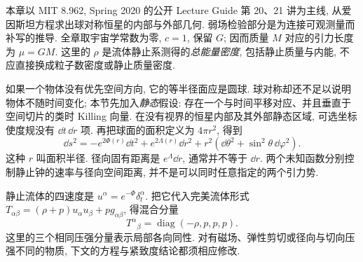 \label{ch:gr-stars}

本章以 MIT 8.962, Spring 2020 的公开 Lecture Guide 第 20、21 讲为主线, 从爱因斯坦方程求出球对称恒星的内部与外部几何. 弱场检验部分是为连接可观测量而补写的推导. 全章取宇宙学常数为零, $c=1$, 保留 $G$; 因而质量 $M$ 对应的引力长度为 $\mu=GM$. 这里的 $\rho$ 是流体静止系测得的\emph{总能量密度}, 包括静止质量与内能, 不应直接换成粒子数密度或静止质量密度.


如果一个物体没有优先空间方向, 它的等半径面应是圆球. 球对称却还不足以说明物体不随时间变化; 本节先加入\emph{静态}假设: 存在一个与时间平移对应、并且垂直于空间切片的类时 Killing 向量. 在没有视界的恒星内部及其外部静态区域, 可选坐标使度规没有 $\dd t\,\dd r$ 项. 再把球面的面积定义为 $4\pi r^2$, 得到
\begin{equation}
 \dd s^2=-e^{2\Phi(r)}\dd t^2+e^{2\Lambda(r)}\dd r^2
             +r^2(\dd\theta^2+\sin^2\theta\,\dd\varphi^2).
 \label{eq:gr-static-spherical}
\end{equation}
这种 $r$ 叫面积半径. 径向固有距离是 $e^{\Lambda}\dd r$, 通常并不等于 $\dd r$. 两个未知函数分别控制静止钟的速率与径向空间距离, 并不是可以同时任意指定的两个引力势.

静止流体的四速度是 $u^\alpha=e^{-\Phi}\delta^\alpha_t$. 把它代入完美流体形式 $T_{\alpha\beta}=(\rho+p)u_\alpha u_\beta+p g_{\alpha\beta}$, 得混合分量
\begin{equation}
 T^\alpha{}_{\beta}=\operatorname{diag}(-\rho,p,p,p).
 \label{eq:gr-fluid-diagonal}
\end{equation}
这里的三个相同压强分量表示局部各向同性. 对有磁场、弹性剪切或径向与切向压强不同的物质, 下文的方程与紧致度结论都须相应修改.

